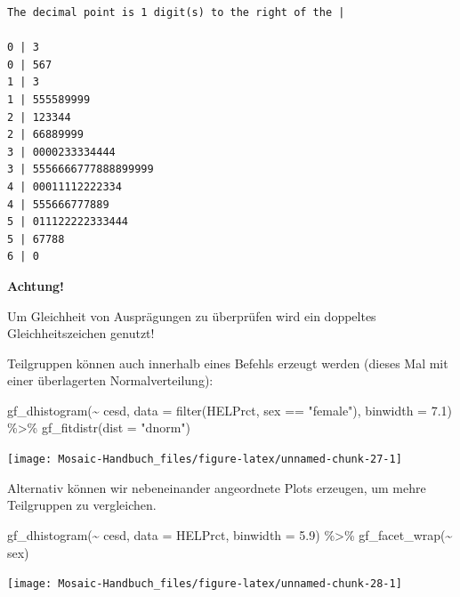 \documentclass[
  ngerman,
]{scrbook}
\newenvironment{Shaded}{\begin{snugshade}}{\end{snugshade}}
\newcommand{\AttributeTok}[1]{\textcolor[rgb]{0.77,0.63,0.00}{#1}}
\newcommand{\FloatTok}[1]{\textcolor[rgb]{0.00,0.00,0.81}{#1}}
\newcommand{\FunctionTok}[1]{\textcolor[rgb]{0.00,0.00,0.00}{#1}}
\newcommand{\NormalTok}[1]{#1}
\newcommand{\SpecialCharTok}[1]{\textcolor[rgb]{0.00,0.00,0.00}{#1}}
\newcommand{\StringTok}[1]{\textcolor[rgb]{0.31,0.60,0.02}{#1}}
\newenvironment{achtung}[1]
  {
  \begin{itemize}
  \renewcommand{\labelitemi}{
    \raisebox{1.8\height}[0pt][0pt]{
      {\setkeys{Gin}{width=7em,keepaspectratio}
        {\Large \textcolor{dark-fom-green}\faExclamationCircle}}
        }
  }
  \begin{blackbox}
        \bgroup\color{dark-fom-green}
          {\textbf{Achtung!}}
        \egroup
  \item
  }
  {
  \end{blackbox}
  \end{itemize}
  }
\begin{document}
\begin{verbatim}
The decimal point is 1 digit(s) to the right of the |

0 | 3
0 | 567
1 | 3
1 | 555589999
2 | 123344
2 | 66889999
3 | 0000233334444
3 | 5556666777888899999
4 | 00011112222334
4 | 555666777889
5 | 011122222333444
5 | 67788
6 | 0
\end{verbatim}

\begin{achtung}{achtung}
Um Gleichheit von Ausprägungen zu überprüfen wird ein doppeltes Gleichheitszeichen genutzt!

\end{achtung}

Teilgruppen können auch innerhalb eines Befehls erzeugt werden (dieses Mal mit einer überlagerten Normalverteilung):

\begin{Shaded}
\begin{Highlighting}[]
\FunctionTok{gf\_dhistogram}\NormalTok{(}\SpecialCharTok{\textasciitilde{}}\NormalTok{ cesd, }\AttributeTok{data =} \FunctionTok{filter}\NormalTok{(HELPrct, sex }\SpecialCharTok{==} \StringTok{"female"}\NormalTok{),}
\AttributeTok{binwidth =} \FloatTok{7.1}\NormalTok{) }\SpecialCharTok{\%\textgreater{}\%}
\FunctionTok{gf\_fitdistr}\NormalTok{(}\AttributeTok{dist =} \StringTok{"dnorm"}\NormalTok{)}
\end{Highlighting}
\end{Shaded}

\begin{center}\texttt{[image: Mosaic-Handbuch\_files/figure-latex/unnamed-chunk-27-1]} \end{center}

Alternativ können wir nebeneinander angeordnete Plots erzeugen, um mehre Teilgruppen zu vergleichen.

\begin{Shaded}
\begin{Highlighting}[]
\FunctionTok{gf\_dhistogram}\NormalTok{(}\SpecialCharTok{\textasciitilde{}}\NormalTok{ cesd, }\AttributeTok{data =}\NormalTok{ HELPrct, }\AttributeTok{binwidth =} \FloatTok{5.9}\NormalTok{) }\SpecialCharTok{\%\textgreater{}\%}
\FunctionTok{gf\_facet\_wrap}\NormalTok{(}\SpecialCharTok{\textasciitilde{}}\NormalTok{ sex)}
\end{Highlighting}
\end{Shaded}

\begin{center}\texttt{[image: Mosaic-Handbuch\_files/figure-latex/unnamed-chunk-28-1]} \end{center}
\end{document}
